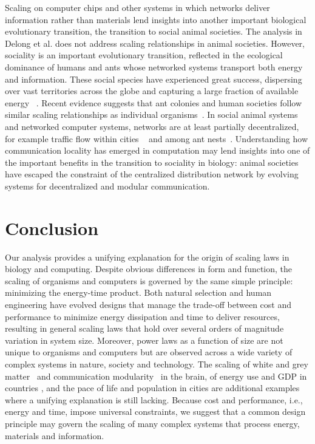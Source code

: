 \documentclass[12pt]{article}
\begin{document}
Scaling on computer chips and other systems in which networks deliver
information rather than materials lend insights into another important
biological evolutionary transition, the transition to social animal societies.
The analysis in Delong et al. does not address scaling relationships in animal societies.
However, sociality is an important evolutionary transition, reflected in the
ecological dominance of humans and ants whose networked
systems transport both energy and information. These social species have experienced great success, dispersing over vast territories across the globe and capturing a large
fraction of available energy ~\cite{haberl2007quantifying, holldobler1990ants}. Recent evidence suggests that ant colonies and
human societies follow similar scaling relationships as individual organisms~\cite{moses2003allometry, bettencourt2007growth, burnside2012human, hou2010energetic, waters2010allometric}. In social animal systems and networked computer systems, networks
are at least partially decentralized, for example traffic flow within cities ~\cite{samaniego2008cities} and among ant nests~\cite{flanagan2013fast}. Understanding
how communication locality has emerged in computation may lend insights into
one of the important benefits in the transition to sociality in biology: animal
societies have escaped the constraint of the centralized distribution network
by evolving systems for decentralized and modular communication.


\section{Conclusion}

Our analysis provides a unifying explanation for the origin of scaling laws in
biology and computing. Despite obvious differences in form and function, the
scaling of organisms and computers is governed by the same simple principle: minimizing the energy-time product. Both natural selection and human engineering have evolved designs that manage the trade-off between cost and performance to minimize energy dissipation and time to deliver resources, resulting in general scaling laws that hold over several orders of magnitude variation in system size. Moreover, power laws as a function of size are not
unique to organisms and computers but are observed across a wide
variety of complex systems in nature, society and technology.  The scaling of
white and grey matter~\cite{zhang00} and communication modularity~\cite{meunier2010modular} in the brain, of energy use and GDP in
countries \cite{brown11}, and the pace of life and population in cities
\cite{bettencourt07} are additional examples where a unifying explanation is
still lacking.  Because cost and performance, i.e., energy and time, impose
universal constraints, we suggest that a common design principle may govern the
scaling of many complex systems that process energy, materials and information.
\end{document}
